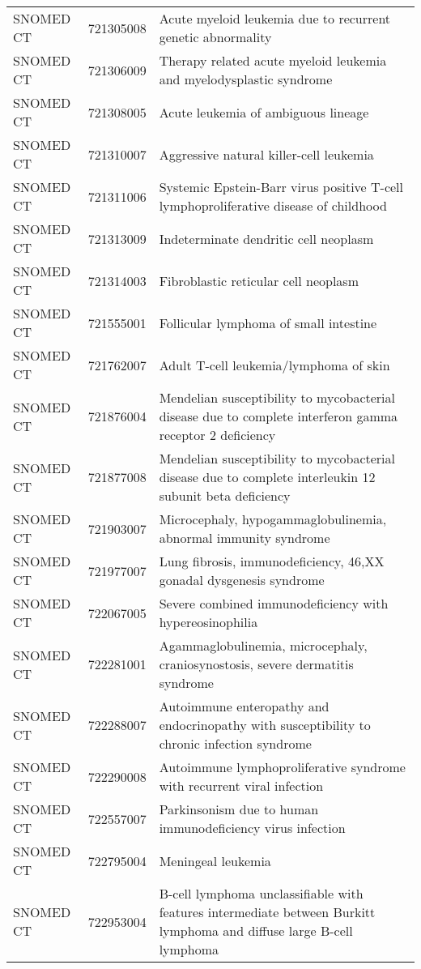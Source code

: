\begin{table}[ht]
\begin{tabular}{lll}
  SNOMED CT & 721305008 & Acute myeloid leukemia due to recurrent genetic abnormality \\ 
  SNOMED CT & 721306009 & Therapy related acute myeloid leukemia and myelodysplastic syndrome \\ 
  SNOMED CT & 721308005 & Acute leukemia of ambiguous lineage \\ 
  SNOMED CT & 721310007 & Aggressive natural killer-cell leukemia \\ 
  SNOMED CT & 721311006 & Systemic Epstein-Barr virus positive T-cell lymphoproliferative disease of childhood \\ 
  SNOMED CT & 721313009 & Indeterminate dendritic cell neoplasm \\ 
  SNOMED CT & 721314003 & Fibroblastic reticular cell neoplasm \\ 
  SNOMED CT & 721555001 & Follicular lymphoma of small intestine \\ 
  SNOMED CT & 721762007 & Adult T-cell leukemia/lymphoma of skin \\ 
  SNOMED CT & 721876004 & Mendelian susceptibility to mycobacterial disease due to complete interferon gamma receptor 2 deficiency \\ 
  SNOMED CT & 721877008 & Mendelian susceptibility to mycobacterial disease due to complete interleukin 12 subunit beta deficiency \\ 
  SNOMED CT & 721903007 & Microcephaly, hypogammaglobulinemia, abnormal immunity syndrome \\ 
  SNOMED CT & 721977007 & Lung fibrosis, immunodeficiency, 46,XX gonadal dysgenesis syndrome \\ 
  SNOMED CT & 722067005 & Severe combined immunodeficiency with hypereosinophilia \\ 
  SNOMED CT & 722281001 & Agammaglobulinemia, microcephaly, craniosynostosis, severe dermatitis syndrome \\ 
  SNOMED CT & 722288007 & Autoimmune enteropathy and endocrinopathy with susceptibility to chronic infection syndrome \\ 
  SNOMED CT & 722290008 & Autoimmune lymphoproliferative syndrome with recurrent viral infection \\ 
  SNOMED CT & 722557007 & Parkinsonism due to human immunodeficiency virus infection \\ 
  SNOMED CT & 722795004 & Meningeal leukemia \\ 
  SNOMED CT & 722953004 & B-cell lymphoma unclassifiable with features intermediate between Burkitt lymphoma and diffuse large B-cell lymphoma \\ 

\end{tabular}
\end{table}
